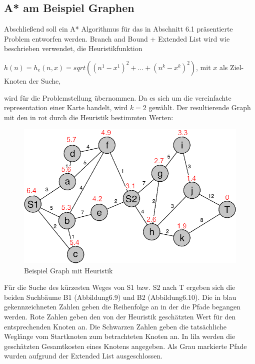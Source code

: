 \subsection{A* am Beispiel Graphen}
Abschlie\ss end soll ein A* Algorithmus f\"ur das in Abschnitt 6.1 pr\"asentierte Problem entworfen werden. Branch and Bound + Extended List wird wie beschrieben verwendet, die Heuristikfunktion 
\begin{center}
$h(n) = h_{e}(n,x) =sqrt((n^{1} - x^{1})^{2}+\dots+(n^{k} - x^{k})^{2})$, mit $x$ als Ziel-Knoten der Suche, 
\end{center}
wird f\"ur die Problemstellung \"ubernommen. Da es sich um die vereinfachte representation einer Karte handelt, wird $k=2$ gew\"ahlt. Der resultierende Graph mit den in rot durch die Heuristik bestimmten Werten: 

\begin{figure}[h!]
	\centering
	\includegraphics[scale=0.9]{chapters/informed_search/AnfangsproblemHeuristik.png}
	\caption{Beispiel Graph mit Heuristik}
\end{figure}

F\"ur die Suche des k\"urzesten Weges von S1 bzw. S2 nach T ergeben sich die beiden Suchb\"aume B1 (Abbildung6.9) und B2 (Abbildung6.10). Die in blau gekennzeichneten Zahlen geben die Reihenfolge an in der die Pfade begangen werden. Rote Zahlen geben den von der Heuristik gesch\"atzten Wert f\"ur den entsprechenden Knoten an. Die Schwarzen Zahlen geben die tats\"achliche Wegl\"ange vom Startknoten zum betrachteten Knoten an. In lila werden die gesch\"atzten Gesamtkosten eines Knotens angegeben. Als Grau markierte Pfade wurden aufgrund der Extended List ausgeschlossen.

